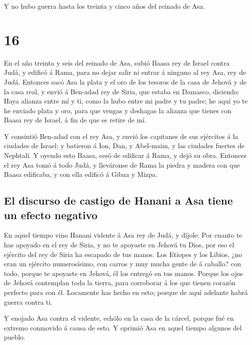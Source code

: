  Y no hubo guerra hasta los treinta y cinco años del
reinado de Asa.

\hypertarget{section-14-16}{%
\section{16}\label{section-14-16}}

 En el año treinta y seis del reinado de Asa, subió Baasa
rey de Israel contra Judá, y edificó á Rama, para no dejar salir ni
entrar á ninguno al rey Asa, rey de Judá.  Entonces sacó
Asa la plata y el oro de los tesoros de la casa de Jehová y de la casa
real, y envió á Ben-adad rey de Siria, que estaba en Damasco, diciendo:
 Haya alianza entre mí y ti, como la hubo entre mi padre y
tu padre; he aquí yo te he enviado plata y oro, para que vengas y
deshagas la alianza que tienes con Baasa rey de Israel, á fin de que se
retire de mí.

 Y consintió Ben-adad con el rey Asa, y envió los
capitanes de sus ejércitos á la ciudades de Israel: y batieron á Ion,
Dan, y Abel-maim, y las ciudades fuertes de Nephtalí.  Y
oyendo esto Baasa, cesó de edificar á Rama, y dejó su obra.
 Entonces el rey Asa tomó á todo Judá, y lleváronse de
Rama la piedra y madera con que Baasa edificaba, y con ella edificó á
Gibaa y Mizpa.

\hypertarget{el-discurso-de-castigo-de-hanani-a-asa-tiene-un-efecto-negativo}{%
\subsection{El discurso de castigo de Hanani a Asa tiene un efecto
negativo}\label{el-discurso-de-castigo-de-hanani-a-asa-tiene-un-efecto-negativo}}

 En aquel tiempo vino Hanani vidente á Asa rey de Judá, y
díjole: Por cuanto te has apoyado en el rey de Siria, y no te apoyaste
en Jehová tu Dios, por eso el ejército del rey de Siria ha escapado de
tus manos.  Los Etiopes y los Libios, ¿no eran un ejército
numerosísimo, con carros y muy mucha gente de á caballo? con todo,
porque te apoyaste en Jehová, él los entregó en tus manos.
 Porque los ojos de Jehová contemplan toda la tierra, para
corroborar á los que tienen corazón perfecto para con él. Locamente has
hecho en esto; porque de aquí adelante habrá guerra contra ti.

 Y enojado Asa contra el vidente, echólo en la casa de la
cárcel, porque fué en extremo conmovido á causa de esto. Y oprimió Asa
en aquel tiempo algunos del pueblo.

